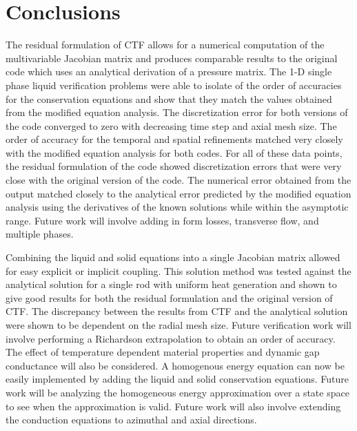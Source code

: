 \vspace*{-80mm}
\chapter{Conclusions} \label{chapter7:uniform_heating}
 

The residual formulation of CTF allows for a numerical computation of the
multivariable Jacobian matrix and produces comparable results to the original
code which uses an analytical derivation of a pressure matrix. The 1-D
single phase liquid verification problems were able to
isolate of the order of accuracies for the conservation equations and show that
they match the values obtained from the modified equation analysis. The
discretization error for both versions of the code converged to zero with
decreasing time step and axial mesh size. The order of accuracy for the temporal
and spatial refinements matched very closely with the modified equation analysis
for both codes. For all of these data points, the residual formulation of the
code showed discretization errors that were very close with the original version
of the code. The numerical error obtained from the output matched closely to
the analytical error predicted by the modified equation analysis using the
derivatives of the known solutions while within the asymptotic range. Future
work will involve adding in form losses, transverse flow, and multiple phases.

Combining the liquid and solid equations into a single Jacobian matrix allowed
for easy explicit or implicit coupling. This solution method was tested against
the analytical solution for a single rod with uniform heat generation and shown
to give good results for both the residual formulation and the original version
of CTF. The discrepancy between the results from CTF and the analytical solution
were shown to be dependent on the radial mesh size. Future verification work
will involve performing a Richardson extrapolation to obtain an order of
accuracy. The effect of temperature dependent material properties and dynamic
gap conductance will also be considered. A homogenous energy equation can now be
easily implemented by adding the liquid and solid conservation equations. Future
work will be analyzing the homogeneous energy approximation over a state space
to see when the approximation is valid. Future work will also involve extending
the conduction equations to azimuthal and axial directions.


